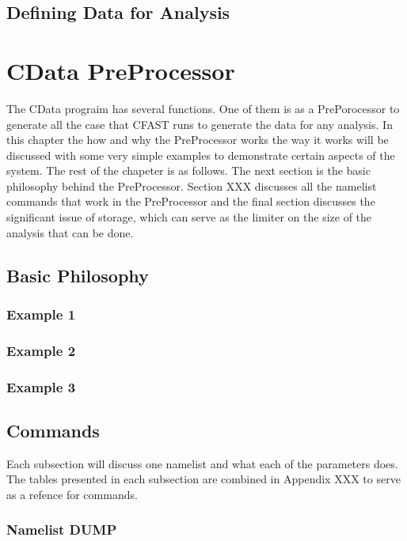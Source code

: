 \documentclass[12pt,twoside]{book}
\begin{document}
\section{Defining Data for Analysis}

%
%

\chapter{CData PreProcessor}
The CData prograim has several functions. One of them is as a PrePorocessor to generate all the case that CFAST runs to generate the data for any analysis. In this chapter the how and why the PreProcessor works the way it works will be discussed with some very simple examples to demonstrate certain aspects of the system. The rest of the chapeter is as follows. The next section is the basic philosophy behind the PreProcessor. Section XXX discusses all the namelist commands that work in the PreProcessor and the final section discusses the significant issue of storage, which can serve as the limiter on the size of the analysis that can be done.

\section{Basic Philosophy}

\subsection{Example 1}

\subsection{Example 2}

\subsection{Example 3}

\section{Commands}
Each subsection will discuss one namelist and what each of the parameters does. The tables presented in each subsection are combined in Appendix XXX  to serve as a refence for commands.

\subsection{Namelist DUMP}
\end{document}
